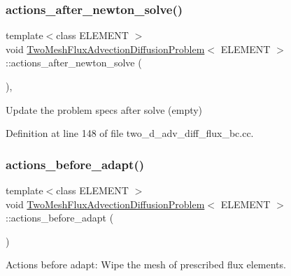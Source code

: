\subsubsection{\texorpdfstring{actions\+\_\+after\+\_\+newton\+\_\+solve()}{actions\_after\_newton\_solve()}}
{\footnotesize\ttfamily template$<$class E\+L\+E\+M\+E\+NT $>$ \\
void \hyperlink{classTwoMeshFluxAdvectionDiffusionProblem}{Two\+Mesh\+Flux\+Advection\+Diffusion\+Problem}$<$ E\+L\+E\+M\+E\+NT $>$\+::actions\+\_\+after\+\_\+newton\+\_\+solve (\begin{DoxyParamCaption}{ }\end{DoxyParamCaption})\hspace{0.3cm}{\ttfamily [inline]}, {\ttfamily [private]}}



Update the problem specs after solve (empty) 



Definition at line 148 of file two\+\_\+d\+\_\+adv\+\_\+diff\+\_\+flux\+\_\+bc.\+cc.

\mbox{\label{classTwoMeshFluxAdvectionDiffusionProblem_a3ea654224e481f37e8bde4edb38993cc}} 
\subsubsection{\texorpdfstring{actions\+\_\+before\+\_\+adapt()}{actions\_before\_adapt()}}
{\footnotesize\ttfamily template$<$class E\+L\+E\+M\+E\+NT $>$ \\
void \hyperlink{classTwoMeshFluxAdvectionDiffusionProblem}{Two\+Mesh\+Flux\+Advection\+Diffusion\+Problem}$<$ E\+L\+E\+M\+E\+NT $>$\+::actions\+\_\+before\+\_\+adapt (\begin{DoxyParamCaption}{ }\end{DoxyParamCaption})\hspace{0.3cm}{\ttfamily [private]}}



Actions before adapt\+: Wipe the mesh of prescribed flux elements. 



